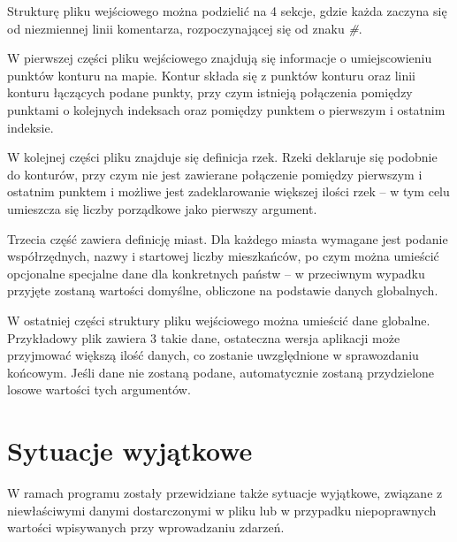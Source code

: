 \documentclass[a4paper,12pt]{article}
\newcommand\tab[1][0.6cm]{\hspace*{#1} }
\begin{document}
Strukturę pliku wejściowego można podzielić na 4 sekcje, gdzie każda zaczyna się od niezmiennej linii komentarza, rozpoczynającej się od znaku \textit{\#}.

W pierwszej części pliku wejściowego znajdują się informacje o umiejscowieniu punktów konturu na mapie. Kontur składa się z punktów konturu oraz linii konturu łączących podane punkty, przy czym istnieją połączenia pomiędzy punktami o kolejnych indeksach oraz pomiędzy punktem o pierwszym i ostatnim indeksie.

W kolejnej części pliku znajduje się definicja rzek. Rzeki deklaruje się podobnie do konturów, przy czym nie jest zawierane połączenie pomiędzy pierwszym i ostatnim punktem i możliwe jest zadeklarowanie większej ilości rzek -- w tym celu umieszcza się liczby porządkowe jako pierwszy argument.

Trzecia część zawiera definicję miast. Dla każdego miasta wymagane jest podanie współrzędnych, nazwy i startowej liczby mieszkańców, po czym można umieścić opcjonalne specjalne dane dla konkretnych państw -- w przeciwnym wypadku przyjęte zostaną wartości domyślne, obliczone na podstawie danych globalnych.

W ostatniej części struktury pliku wejściowego można umieścić dane globalne. Przykładowy plik zawiera 3 takie dane, ostateczna wersja aplikacji może przyjmować większą ilość danych, co zostanie uwzględnione w sprawozdaniu końcowym. Jeśli dane nie zostaną podane, automatycznie zostaną przydzielone losowe wartości tych argumentów.

\section{Sytuacje wyjątkowe}

\tab W ramach programu zostały przewidziane także sytuacje wyjątkowe, związane z niewłaściwymi danymi dostarczonymi w pliku lub w przypadku niepoprawnych wartości wpisywanych przy wprowadzaniu zdarzeń.
\end{document}
